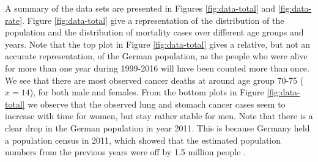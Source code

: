 \newpar A summary of the data sets are presented in Figures \ref{fig:data-total} and \ref{fig:data-rate}. Figure \ref{fig:data-total} give a representation of the distribution of the population and the distribution of mortality cases over different age groups and years. Note that the top plot in Figure \ref{fig:data-total} gives a relative, but not an accurate representation, of the German population, as the people who were alive for more than one year during 1999-2016 will have been counted more than once. We see that there are most observed cancer deaths at around age group 70-75 ($x = 14$), for both male and females. From the bottom plots in Figure \ref{fig:data-total} we observe that the observed lung and stomach cancer cases seem to increase with time for women, but stay rather stable for men. Note that there is a clear drop in the German population in year 2011. This is because Germany held a population census in 2011, which showed that the estimated population numbers from the previous years were off by 1.5 million people \parencite{germanCensus}.

